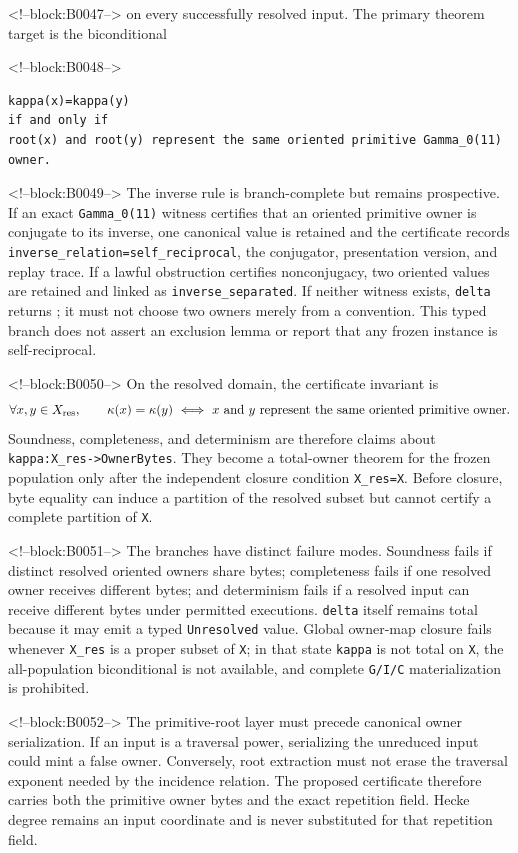 \documentclass[11pt]{article}
\begin{document}
<!--block:B0047-->
on every successfully resolved input. The primary theorem target is the
biconditional

<!--block:B0048-->
\begin{verbatim}
kappa(x)=kappa(y)
if and only if
root(x) and root(y) represent the same oriented primitive Gamma_0(11) owner.
\end{verbatim}

<!--block:B0049-->
The inverse rule is branch-complete but remains prospective.  If an exact
\texttt{Gamma\_0(11)} witness certifies that an oriented primitive owner is
conjugate to its inverse, one canonical value is retained and the certificate
records \texttt{inverse\_relation=self\_reciprocal}, the conjugator, presentation
version, and replay trace.  If a lawful obstruction certifies nonconjugacy, two
oriented values are retained and linked as \texttt{inverse\_separated}.  If
neither witness exists, \texttt{delta} returns
; it must not choose two owners merely from a
convention.  This typed branch does not assert an exclusion lemma or report that
any frozen instance is self-reciprocal.

<!--block:B0050-->
On the resolved domain, the certificate invariant is
\[
  \forall x,y\in X_{\rm res},\qquad
  \kappa(x)=\kappa(y)\ \Longleftrightarrow\
  x\text{ and }y\text{ represent the same oriented primitive owner}.
\]
Soundness, completeness, and determinism are therefore claims about
\texttt{kappa:X\_res->OwnerBytes}.  They become a total-owner theorem for the
frozen population only after the independent closure condition
\texttt{X\_res=X}.  Before closure, byte equality can induce a partition of the
resolved subset but cannot certify a complete partition of \texttt{X}.

<!--block:B0051-->
The branches have distinct failure modes.  Soundness fails if distinct resolved
oriented owners share bytes; completeness fails if one resolved owner receives
different bytes; and determinism fails if a resolved input can receive different
bytes under permitted executions.  \texttt{delta} itself remains total because
it may emit a typed \texttt{Unresolved} value.  Global owner-map closure fails
whenever \texttt{X\_res} is a proper subset of \texttt{X}; in that state
\texttt{kappa} is not total on \texttt{X}, the all-population biconditional is not
available, and complete \texttt{G/I/C} materialization is prohibited.

<!--block:B0052-->
The primitive-root layer must precede canonical owner serialization.
If an input is a traversal power, serializing the unreduced input could
mint a false owner. Conversely, root extraction must not erase the
traversal exponent needed by the incidence relation. The proposed
certificate therefore carries both the primitive owner bytes and the
exact repetition field. Hecke degree remains an input coordinate and is
never substituted for that repetition field.
\end{document}

